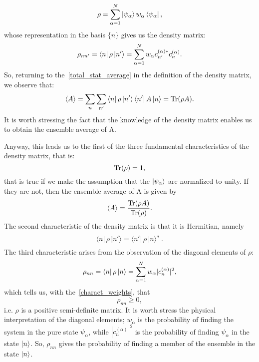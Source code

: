 \begin{equation}
    \rho = \sum_{\alpha = 1}^N \ket{\psi_\alpha} w_\alpha \bra{\psi_\alpha},
\end{equation}
whose representation in the basis $\{n\}$ gives us the density matrix:
\begin{equation}
    \rho_{nn'} = \bra{n}\rho\ket{n'} = \sum_{\alpha = 1}^N w_\alpha c_{n'}^{(\alpha)*} c_n^{(\alpha)}.
\end{equation}
So, returning to the~\ref{total_stat_average} in the definition of the density matrix, we observe that:
\begin{equation*}
    \braket{A} = \sum_n \sum_{n'} \bra{n}\rho\ket{n'}\bra{n'}A\ket{n} = \operatorname{Tr}({\rho A}).
\end{equation*}
It is worth stressing the fact that the knowledge of the density matrix enables us to obtain the ensemble average of A.

Anyway, this leads us to the first of the three fundamental characteristics of the density matrix, that is:
\begin{equation}
    \operatorname{Tr}(\rho) = 1,
\end{equation}
that is true if we make the assumption that the $\ket{\psi_\alpha}$ are normalized to unity. If they are not, then the ensemble average of A is given by
\begin{equation}
    \braket{A} = \frac{\operatorname{Tr}(\rho A)}{\operatorname{Tr}(\rho)}.
\end{equation}
The second characteristic of the density matrix is that it is Hermitian, namely
\begin{equation}
    \bra{n}\rho\ket{n'} = \bra{n'}\rho\ket{n}^*.
\end{equation}
The third characteristic arises from the observation of the diagonal elements of $\rho$:
\begin{equation}
    \rho_{nn} = \bra{n}\rho\ket{n} = \sum_{\alpha = 1}^N w_\alpha |c_{n}^{(\alpha)}|^2,
\end{equation}
which tells us, with the~\ref{charact_weights}, that
\begin{equation}
    \rho_{nn} \geq 0,
\end{equation}
i.e. $\rho$ is a positive semi-definite matrix.
It is worth stress the physical interpretation of the diagonal elements; $w_\alpha$ is the probability of finding the system in the pure state $\psi_\alpha$, while $|c_{n}^{(\alpha)}|^2$ is the probability of finding $\psi_\alpha$ in the state $\ket{n}$. So, $\rho_{nn}$ gives the probability of finding a member of the ensemble in the state $\ket{n}$.

